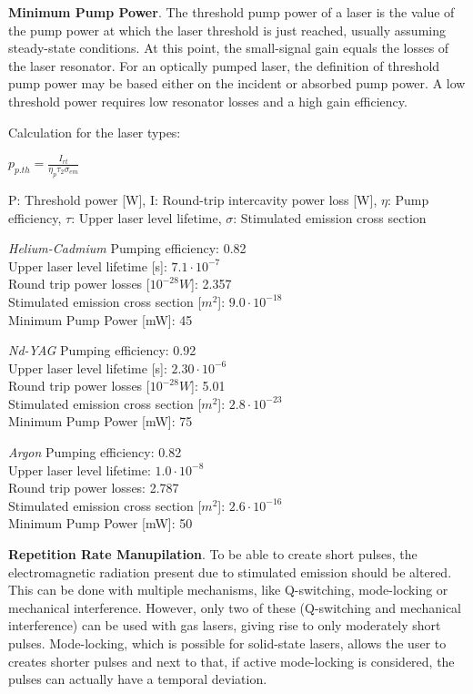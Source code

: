 \textbf{Minimum Pump Power}. \cite{lasertech}The threshold pump power of a laser is the value of the pump power at which the laser threshold is just reached, usually assuming steady-state conditions. At this point, the small-signal gain equals the losses of the laser resonator. For an optically pumped laser, the definition of threshold pump power may be based either on the incident or absorbed pump power. A low threshold power requires low resonator losses and a high gain efficiency.

Calculation for the \acs{laser} types:

\begin{center}
$p_{p.th} = \frac{I_{rt}}{\eta_{p}\tau_{2}\sigma_{em}}$
\end{center}

P: Threshold power [W], I: Round-trip intercavity power loss [W], $\eta$: Pump efficiency, $\tau$: Upper laser level lifetime, $\sigma$: Stimulated emission cross section

\textit{Helium-Cadmium}
Pumping efficiency: 0.82\\
Upper \acs{laser} level lifetime [s]: $7.1\cdot10^{-7}$\\
Round trip power losses [$10^{-28} W$]: 2.357 \\
Stimulated emission cross section [$m^{2}$]: $9.0\cdot10^{-18}$\\
Minimum Pump Power [mW]: 45 

\textit{Nd-YAG}
Pumping efficiency: 0.92\\
Upper \acs{laser} level lifetime [s]: $2.30\cdot10^{-6}$\\
Round trip power losses [$10^{-28} W$]: 5.01\\
Stimulated emission cross section [$m^{2}$]: $2.8\cdot10^{-23}$\\
Minimum Pump Power [mW]: 75

\textit{Argon}
Pumping efficiency: 0.82\\
Upper \acs{laser} level lifetime: $1.0\cdot10^{-8}$\\
Round trip power losses:  2.787\\
Stimulated emission cross section [$m^{2}$]: $2.6\cdot10^{-16}$\\
Minimum Pump Power [mW]: 50

\textbf{Repetition Rate Manupilation}. To be able to create short pulses, the electromagnetic radiation present due to stimulated emission should be altered. This can be done with multiple mechanisms, like Q-switching, mode-locking or mechanical interference. However, only two of these (Q-switching and mechanical interference) can be used with gas \acs{laser}s, giving rise to only moderately short pulses. Mode-locking, which is possible for solid-state \acs{laser}s, allows the user to creates shorter pulses and next to that, if active mode-locking is considered, the pulses can actually have a temporal deviation. 
 
